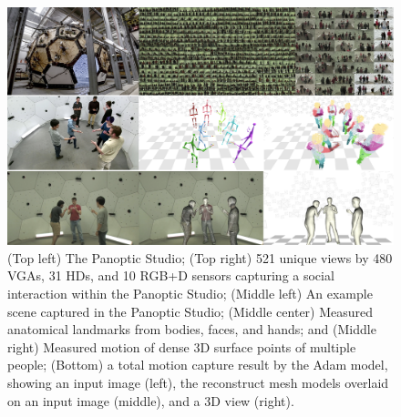 

\begin{figure}[t]
	\centering
	\includegraphics[width=\textwidth]{figures/teaser_4}
	\caption{(Top left) The Panoptic Studio; (Top right) 521 unique views by 480 VGAs, 31 HDs, and 10 RGB+D sensors capturing a social interaction within the Panoptic Studio; (Middle left) An example scene captured in the Panoptic Studio; (Middle center) Measured anatomical landmarks from bodies, faces, and hands; and (Middle right) Measured motion of dense 3D surface points of multiple people; (Bottom) a total motion capture result by the Adam model, showing an input image (left), the reconstruct mesh models overlaid on an input image (middle), and a 3D view (right).}	
	\label{fig:teaser}
\end{figure}


